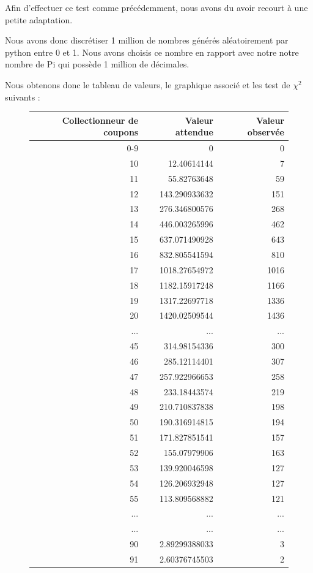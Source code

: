 \documentclass[10pt,a4paper]{article}
\begin{document}
Afin d'effectuer ce test comme précédemment, nous avons du avoir recourt à une petite adaptation. 

Nous avons donc discrétiser 1 million de nombres générés aléatoirement par python entre 0 et 1. Nous avons choisis ce nombre en rapport avec notre notre nombre de Pi qui possède 1 million de décimales.

Nous obtenons donc le tableau de valeurs, le graphique associé et les test de $\chi^2$ suivants :

 \begin{figure}[h]
\centering
\begin{tabular}{|r|r|r|}
\hline
Collectionneur de coupons & Valeur attendue & Valeur observée\\
\hline
0-9 & 0 & 0\\
10 & 12.40614144 & 7\\
11 & 55.82763648 & 59\\
12 & 143.290933632 & 151\\
13 & 276.346800576 & 268\\
14 & 446.003265996 & 462\\
15 & 637.071490928 & 643\\
16 & 832.805541594 & 810\\
17 & 1018.27654972 & 1016\\
18 & 1182.15917248 & 1166\\
19 & 1317.22697718 & 1336\\
20 & 1420.02509544 & 1436\\
... & ... & ...\\
45 & 314.98154336 & 300\\
46 & 285.12114401 & 307\\
47 & 257.922966653 & 258\\
48 & 233.18443574 & 219\\
49 & 210.710837838 & 198\\
50 & 190.316914815 & 194\\
51 & 171.827851541 & 157\\
52 & 155.07979906 & 163\\
53 & 139.920046598 & 127\\
54 & 126.206932948 & 127\\
55 & 113.809568882 & 121\\
... & ... & ...\\
... & ... & ...\\
90 & 2.89299388033 & 3\\
91 & 2.60376745503 & 2\\

\end{tabular}
\end{figure}
\end{document}
